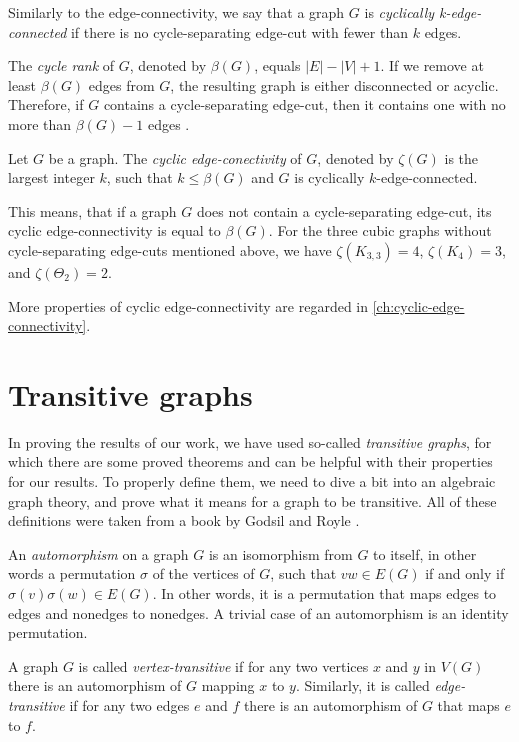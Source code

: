 \documentclass[12pt, twoside]{book}
\begin{document}
Similarly to the edge-connectivity, we say that a graph $G$ is \textit{cyclically k-edge-connected} if there is no cycle-separating edge-cut with fewer than $k$ edges.

The \textit{cycle rank} of $G$, denoted by $\beta(G)$, equals $|E|-|V|+1$. If we remove at least $\beta(G)$ edges from $G$, the resulting graph is either disconnected or acyclic. Therefore, if $G$ contains a cycle-separating edge-cut, then it contains one with no more than $\beta(G)-1$ edges \cite{atoms-of-cyclic}.

\begin{definition}
	Let $G$ be a graph. The \textit{cyclic edge-conectivity} of $G$, denoted by $\zeta(G)$ is the largest integer $k$, such that $k\leq \beta(G)$ and $G$ is cyclically $k$-edge-connected.
\end{definition}

This means, that if a graph $G$ does not contain a cycle-separating edge-cut, its cyclic edge-connectivity is equal to $\beta(G)$. For the three cubic graphs without cycle-separating edge-cuts mentioned above, we have $\zeta(K_{3,3})=4$, $\zeta(K_4)=3$, and $\zeta(\Theta_2)=2$.

More properties of cyclic edge-connectivity are regarded in \cref{ch:cyclic-edge-connectivity}.

\section{Transitive graphs}

In proving the results of our work, we have used so-called \textit{transitive graphs}, for which there are some proved theorems and can be helpful with their properties for our results. To properly define them, we need to dive a bit into an algebraic graph theory, and prove what it means for a graph to be transitive. All of these definitions were taken from a book by Godsil and Royle \cite{algebraic-graph-theory}.

An \textit{automorphism} on a graph $G$ is an isomorphism from $G$ to itself, in other words a permutation $\sigma$ of the vertices of $G$, such that $vw\in E(G)$ if and only if $\sigma(v)\sigma(w)\in E(G)$. In other words, it is a permutation that maps edges to edges and nonedges to nonedges. A trivial case of an automorphism is an identity permutation.

A graph $G$ is called \emph{vertex-transitive} if for any two vertices $x$ and $y$ in $V(G)$ there is an automorphism of $G$ mapping $x$ to $y$. Similarly, it is called \emph{edge-transitive} if for any two edges $e$ and $f$ there is an automorphism of $G$ that maps $e$ to $f$.
\end{document}
